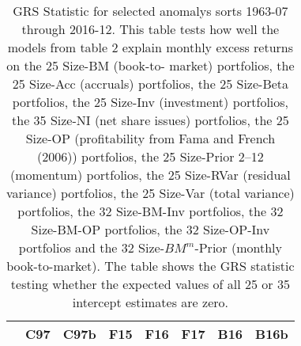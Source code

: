 
\begin{table}[!ht]
\centering
\caption{
\scriptsize{
GRS Statistic for selected anomalys sorts 1963-07 through 2016-12. This table tests how
well the models from table 2 explain monthly excess returns on the 25 Size-BM (book-to-
market) portfolios, the 25 Size-Acc (accruals) portfolios, the 25 Size-Beta portfolios,
the 25 Size-Inv (investment) portfolios, the 35 Size-NI (net share issues) portfolios, the
25 Size-OP (profitability from Fama and French (2006)) portfolios, the 25 Size-Prior 2–12
(momentum) portfolios, the 25 Size-RVar (residual variance) portfolios, the 25 Size-Var
(total variance) portfolios, the 32 Size-BM-Inv portfolios, the 32 Size-BM-OP portfolios,
the 32 Size-OP-Inv portfolios and the 32 Size-$BM^m$-Prior (monthly book-to-market). The
table shows the GRS statistic testing whether the expected values of all 25 or 35
intercept estimates are zero.
}
}
\begin{tabular}{lrrrrrrr}
  \toprule
                            &  C97  & C97b  &  F15  &  F16  &   F17  & B16  & B16b  \\
  \midrule
  

\end{tabular}
\end{table}

